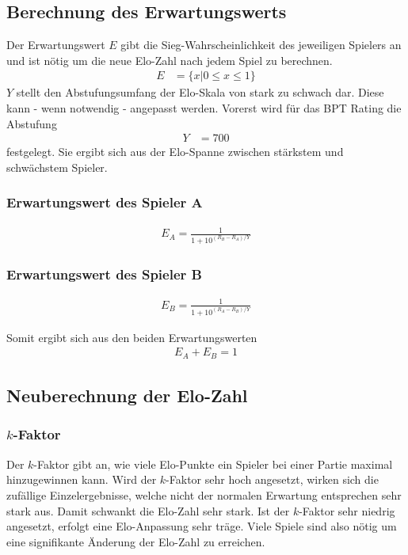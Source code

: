 \documentclass[a4paper, 12pt]{article}
\newcounter{arti}
\begin{document}
\subsection{Berechnung des Erwartungswerts}
Der Erwartungswert \(E\) gibt die Sieg-Wahrscheinlichkeit des jeweiligen Spielers an und ist nötig um die neue Elo-Zahl nach jedem Spiel zu berechnen.
\begin{align}
E&=\{x|0 \leq x \leq 1\}
\end{align}
\(Y\) stellt den Abstufungsumfang der Elo-Skala von stark zu schwach dar. Diese kann - wenn notwendig - angepasst werden. Vorerst wird für das BPT Rating die Abstufung
\begin{align}
Y&=700
\end{align}
festgelegt. Sie ergibt sich aus der Elo-Spanne zwischen stärkstem und schwächstem Spieler.

\subsubsection{Erwartungswert des Spieler A}
\begin{align}
E_{A} = \frac{1}{1+10^{(R_{B}-R_{A})/Y}}
\end{align}

\subsubsection{Erwartungswert des Spieler B}
\begin{align}
E_{B} = \frac{1}{1+10^{(R_{A}-R_{B})/Y}}
\end{align}

Somit ergibt sich aus den beiden Erwartungswerten
\begin{align}
E_A + E_B = 1
\end{align}

\subsection{Neuberechnung der Elo-Zahl}
\subsubsection{\(k\)-Faktor}
Der \(k\)-Faktor gibt an, wie viele Elo-Punkte ein Spieler bei einer Partie maximal hinzugewinnen kann.
Wird der \(k\)-Faktor sehr hoch angesetzt, wirken sich die zufällige Einzelergebnisse, welche nicht der normalen Erwartung entsprechen sehr stark aus. Damit schwankt die Elo-Zahl sehr stark.
Ist der \(k\)-Faktor sehr niedrig angesetzt, erfolgt eine Elo-Anpassung sehr träge. Viele Spiele sind also nötig um eine signifikante Änderung der Elo-Zahl zu erreichen.
\end{document}

